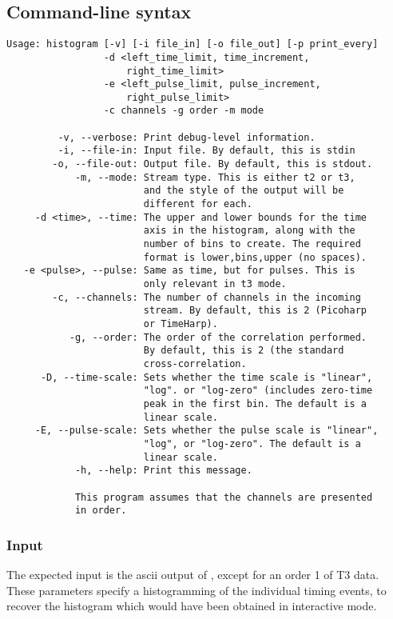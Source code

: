 \subsection{Command-line syntax}
\begin{verbatim}
Usage: histogram [-v] [-i file_in] [-o file_out] [-p print_every]
                 -d <left_time_limit, time_increment, 
                     right_time_limit> 
                 -e <left_pulse_limit, pulse_increment, 
                     right_pulse_limit> 
                 -c channels -g order -m mode

         -v, --verbose: Print debug-level information.
         -i, --file-in: Input file. By default, this is stdin
        -o, --file-out: Output file. By default, this is stdout.
            -m, --mode: Stream type. This is either t2 or t3, 
                        and the style of the output will be 
                        different for each.
     -d <time>, --time: The upper and lower bounds for the time
                        axis in the histogram, along with the 
                        number of bins to create. The required 
                        format is lower,bins,upper (no spaces).
   -e <pulse>, --pulse: Same as time, but for pulses. This is 
                        only relevant in t3 mode.
        -c, --channels: The number of channels in the incoming
                        stream. By default, this is 2 (Picoharp
                        or TimeHarp).
           -g, --order: The order of the correlation performed.
                        By default, this is 2 (the standard 
                        cross-correlation.
      -D, --time-scale: Sets whether the time scale is "linear", 
                        "log". or "log-zero" (includes zero-time
                        peak in the first bin. The default is a
                        linear scale.
     -E, --pulse-scale: Sets whether the pulse scale is "linear", 
                        "log", or "log-zero". The default is a 
                        linear scale.
            -h, --help: Print this message.

            This program assumes that the channels are presented
            in order.
\end{verbatim}

\subsubsection{Input}
The expected input is the ascii output of , except for an order 1 of T3 data. These parameters specify a histogramming of the individual timing events, to recover the histogram which would have been obtained in interactive mode.

